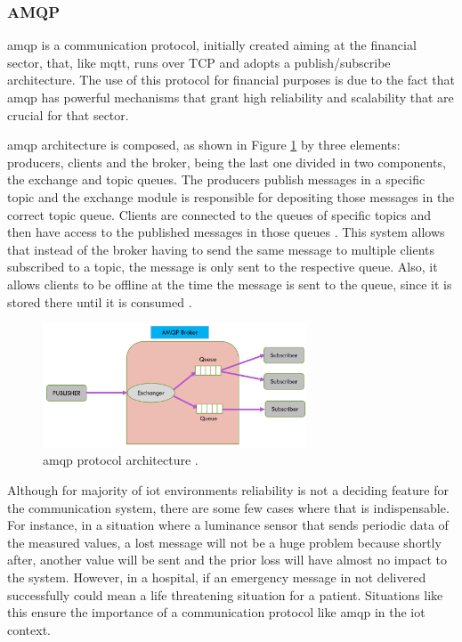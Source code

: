 \subsubsection{AMQP}

\acf{amqp} is a communication protocol, initially created aiming at the financial sector, that, like \ac{mqtt}, runs over TCP and adopts a publish/subscribe architecture. The use of this protocol for financial purposes is due to the fact that \ac{amqp} has powerful mechanisms that grant high reliability and scalability that are crucial for that sector.

\ac{amqp} architecture is composed, as shown in Figure \ref{fig:amqp} by three elements: producers, clients and the broker, being the last one divided in two components, the exchange and topic queues. The producers publish messages in a specific topic and the exchange module is responsible for depositing those messages in the correct topic queue. Clients are connected to the queues of specific topics and then have access to the published messages in those queues \cite{Salman2013}. This system allows that instead of the broker having to send the same message to multiple clients subscribed to a topic, the message is only sent to the respective queue. Also, it allows clients to be offline at the time the message is sent to the queue, since it is stored there until it is consumed \cite{Al-fuqaha2015}.

\begin{figure}[H]
	\centering
	\includegraphics[width=0.7\textwidth]{figures/amqp.png}
	\caption{\ac{amqp} protocol architecture \cite{Badugu}.}
	\label{fig:amqp}
\end{figure}

Although for majority of \ac{iot} environments reliability is not a deciding feature for the communication system, there are some few cases where that is indispensable. For instance, in a situation where a luminance sensor that sends periodic data of the measured values, a lost message will not be a huge problem because shortly after, another value will be sent and the prior loss will have almost no impact to the system. However, in a hospital, if an emergency message in not delivered successfully could mean a life threatening situation for a patient. Situations like this ensure the importance of a communication protocol like \ac{amqp} in the \ac{iot} context.

